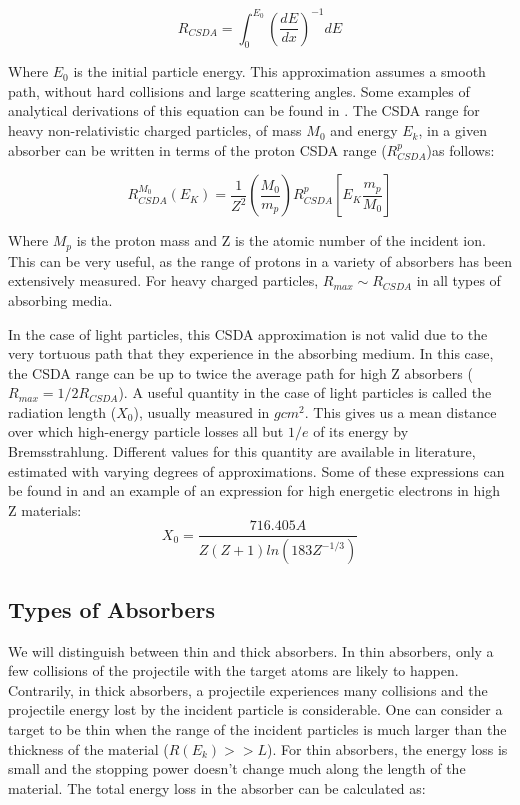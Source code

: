 \begin{equation}
    R_{CSDA} = \int_{0}^{E_0} \left( \frac{dE}{dx} \right)^{-1} dE
    \label{eq:rangeCSDA}
\end{equation}

Where $E_0$ is the initial particle energy. This approximation assumes a smooth path, without hard collisions and large scattering angles. Some examples of analytical derivations of this equation can be found in \parencite*[][]{ref:CSDA}. The CSDA range for heavy non-relativistic charged particles, of mass $M_0$ and energy $E_k$, in a given absorber can be written in terms of the proton CSDA range ($R^{p}_{CSDA}$)as follows: 

\begin{equation}
    R_{CSDA}^{M_0} \left( E_K \right)= \frac{1}{Z^2} \left(\frac{M_0}{m_p}\right) R_{CSDA}^{p}\left[ E_K \frac{m_p}{M_0}\right]
\end{equation}

Where $M_p$ is the proton mass and Z is the atomic number of the incident ion. This can be very useful, as the range of protons in a variety of absorbers has been extensively measured. For heavy charged particles, $R_{max} \sim R_{CSDA}$ in all types of absorbing media. 

In the case of light particles, this CSDA approximation is not valid due to the very tortuous path that they experience in the absorbing medium. In this case, the CSDA range can be up to twice the average path for high Z absorbers ($R_{max} = 1/2 R_{CSDA}$). A useful quantity in the case of light particles is called the radiation length ($X_0$), usually measured in $g cm^2$. This gives us a mean distance over which high-energy particle losses all but $1/e$ of its energy by Bremsstrahlung. Different values for this quantity are available in literature, estimated with varying degrees of approximations. Some of these expressions can be found in \parencite*[][]{ref:radiationLength} and an example of an expression for high energetic electrons in high Z materials: 
\begin{equation}
    X_0 = \frac{716.405 A}{Z\left(Z+1\right)ln\left(183 Z^{-1/3}\right)}
    \label{eq:radiationlength.}
\end{equation}

\subsection{Types of Absorbers}

We will distinguish between thin and thick absorbers. In thin absorbers, only a few collisions of the projectile with the target atoms are likely to happen. Contrarily, in thick absorbers, a projectile experiences many collisions and the projectile energy lost by the incident particle is considerable. One can consider a target to be thin when the range of the incident particles is much larger than the thickness of the material ($R(E_k) >> L$). For thin absorbers, the energy loss is small and the stopping power doesn't change much along the length of the material. The total energy loss in the absorber can be calculated as: 

